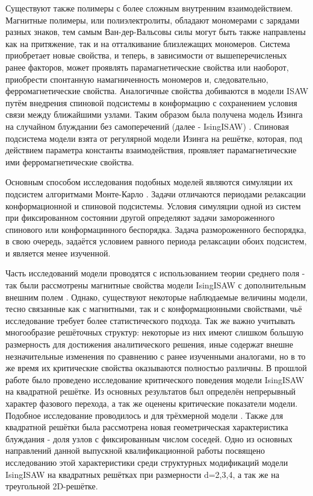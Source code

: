 
Существуют также полимеры с более сложным внутренним взаимодействием.
Магнитные полимеры, или полиэлектролиты, обладают мономерами с зарядами разных знаков, 
тем самым Ван-дер-Вальсовы силы могут быть также направлены как на притяжение,
так и на отталкивание близлежащих мономеров.
Система приобретает новые свойства, и теперь, в зависимости от вышеперечисленых ранее факторов, может проявлять парамагнетические свойства или наоборот, приобрести спонтанную намагниченность мономеров и, следовательно, ферромагнетические свойства.  
Аналогичные свойства добиваются в модели ISAW путём внедрения спиновой подсистемы в конформацию 
с сохранением условия связи между ближайшими узлами.
Таким образом была получена модель Изинга на случайном блуждании без самоперечений (далее - IsingISAW) \cite{Aerstens1992}.
Спиновая подсистема модели взята от регулярной модели Изинга на решётке, которая, под действием параметра константы взаимодействия, проявляет парамагнетические ими ферромагнетические свойства.

Основным способом исследования подобных моделей являются симуляции их подсистем алгоритмами Монте-Карло \cite{Worm, Wolff, madras1988pivot}.
Задачи отличаются периодами релаксации конформационной и спиновой подсистемы.
Условия симуляции одной из систем при фиксированном состоянии другой определяют задачи замороженного спинового или конформацинного беспорядка.
Задача размороженного беспорядка, в свою очередь, задаётся условием равного периода релаксации обоих подсистем, и является менее изученной.

Часть исследований модели проводятся с использованием теории среднего поля - так были рассмотрены магнитные свойства модели IsingISAW с дополнительным внешним полем \cite{Garel1999}. 
Однако, существуют некоторые наблюдаемые величины модели, тесно связанные как с магнитными, так и с конформационными свойствами, чьё исследование требует более статистического подхода.
Так же важно учитывать многообразие решёточных структур: некоторые из них имеют слишком большую размерность для достижения аналитического решения, 
иные содержат внешне незначительные изменения по сравнению с ранее изученными аналогами, 
но в то же время их критические свойства оказываются полностью различны.
В прошлой работе \cite{faizullina2021critical} было проведено исследование критического поведения модели IsingISAW на квадратной решётке.
Из основных результатов был определён непрерывный характер фазового перехода, а так же оценены критические показатели модели.
Подобное исследование проводилось и для трёхмерной модели \cite{foster2021critical}.
Также для квадратной решётки была рассмотрена новая геометрическая характеристика блуждания - доля узлов с фиксированным числом соседей. 
Одно из основных направлений данной выпускной квалификационной работы посвящено исследованию этой характеристики среди 
структурных модификаций модели IsingISAW на квадратных решётках при размерности d=2,3,4, а так же на треугольной 2D-решётке.

